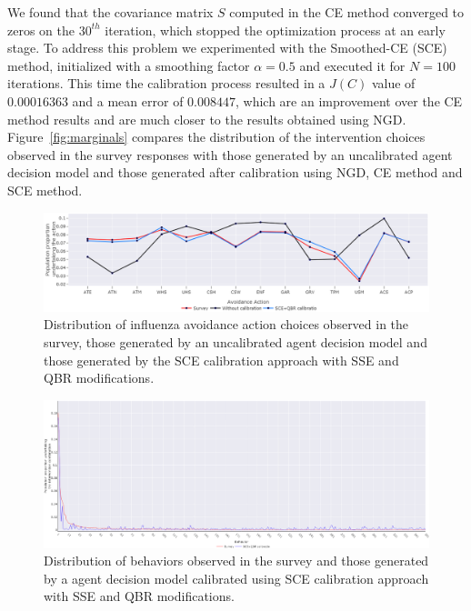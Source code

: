 \documentclass[doublespace,draft]{VTthesis}
\begin{document}
    We found that the covariance matrix $S$ computed in the CE method converged to zeros on the $30^{th}$ iteration, which stopped the optimization process at an early stage. To address this problem we experimented with the Smoothed-CE (SCE) method, initialized with a smoothing factor $\alpha = 0.5$ and executed it for $N=100$ iterations. This time the calibration process resulted in a $J(C)$ value of $0.00016363$ and a mean error of $0.008447$, which are an improvement over the CE method results and are much closer to the results obtained using NGD. Figure~\ref{fig:marginals} compares the distribution of the intervention choices observed in the survey responses with those generated by an uncalibrated agent decision model and those generated after calibration using NGD, CE method and SCE method.
    
    \begin{figure}
    \centering
    \includegraphics[width=\textwidth]{figures/qbr-marginals.png}
    \caption{Distribution of influenza avoidance action choices observed in the survey, those generated by an uncalibrated agent decision model and those generated by the SCE calibration approach with SSE and QBR modifications.}
    \label{fig:qbr-marginals}
    \end{figure}
    \begin{figure}
    \centering
    \includegraphics[width=\textwidth]{figures/qbr-joints.png}
    \caption{Distribution of behaviors observed in the survey and those generated by a agent decision model calibrated using SCE calibration approach with SSE and QBR modifications.}
    \label{fig:qbr-joints}
    \end{figure}
    
\end{document}
